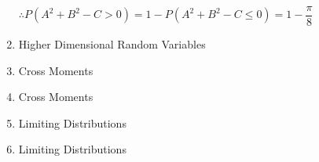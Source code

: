 \documentclass[12pt, oneside]{article}
\begin{document}
\begin{enumerate}
{    \(\therefore P(A^2 + B^2 - C > 0) = 1 - P(A^2 + B^2 - C \leq 0) = 1 - \dfrac{\pi}{8}\)
}

\item Higher Dimensional Random Variables

\item Cross Moments

\item Cross Moments

\item Limiting Distributions

\item Limiting Distributions



\end{enumerate}
\end{document}
